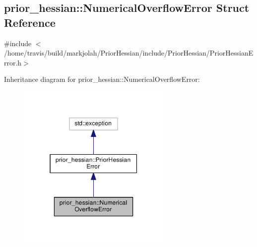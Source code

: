 \hypertarget{structprior__hessian_1_1NumericalOverflowError}{}\subsection{prior\+\_\+hessian\+:\+:Numerical\+Overflow\+Error Struct Reference}
\label{structprior__hessian_1_1NumericalOverflowError}


{\ttfamily \#include $<$/home/travis/build/markjolah/\+Prior\+Hessian/include/\+Prior\+Hessian/\+Prior\+Hessian\+Error.\+h$>$}



Inheritance diagram for prior\+\_\+hessian\+:\+:Numerical\+Overflow\+Error\+:\nopagebreak
\begin{figure}[H]
\begin{center}
\leavevmode
\includegraphics[width=211pt]{structprior__hessian_1_1NumericalOverflowError__inherit__graph}
\end{center}
\end{figure}


